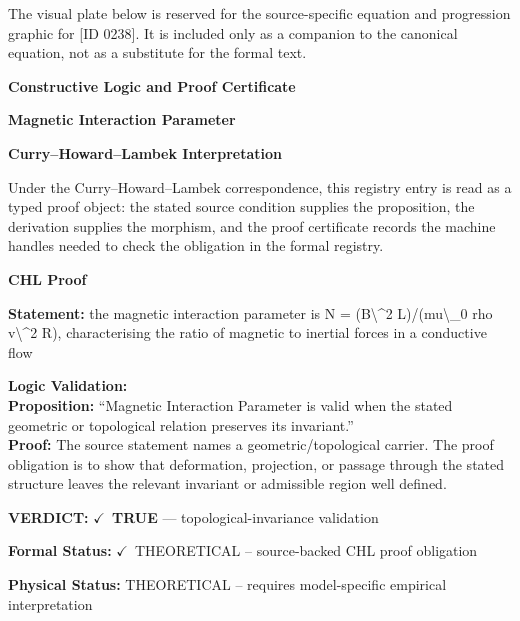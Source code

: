 \begingroup\footnotesize\sloppy
The visual plate below is reserved for the source-specific equation and progression graphic for [ID 0238]. It is included only as a companion to the canonical equation, not as a substitute for the formal text.
\par\endgroup
\ifTZPDarkEdition
{}
\fi

\clearpage
\begingroup\tzpsupportsetup
\noindent\textbf{\fontsize{10.8pt}{12.8pt}\selectfont [ID 0238] Constructive Logic and Proof Certificate}\par
\noindent\textbf{\fontsize{10pt}{12pt}\selectfont Magnetic Interaction Parameter}\par
\vspace{0.45em}
\begingroup
\footnotesize
\setlength{\parskip}{0.22em}
\setlength{\parindent}{0pt}
\noindent\textbf{Curry--Howard--Lambek Interpretation}\par
Under the Curry--Howard--Lambek correspondence, this registry entry is read as a typed proof
object: the stated source condition supplies the proposition, the derivation supplies the
morphism, and the proof certificate records the machine handles needed to check the obligation
in the formal registry.

\vspace{0.45em}
\noindent\textbf{CHL Proof}\par
\textbf{Statement:} the magnetic interaction parameter is N = (B\textbackslash{}\textasciicircum{}2 L)/(mu\textbackslash{}\_0 rho v\textbackslash{}\textasciicircum{}2 R), characterising
the ratio of magnetic to inertial forces in a conductive flow

\textbf{Logic Validation:}\\
\textbf{Proposition:} ``Magnetic Interaction Parameter is valid when the stated geometric or topological
relation preserves its invariant.''\\
\textbf{Proof:} The source statement names a geometric/topological carrier. The proof obligation is to
show that deformation, projection, or passage through the stated structure leaves the
relevant invariant or admissible region well defined.

\textbf{VERDICT:} \ensuremath{\checkmark}\ \textbf{TRUE} --- topological-invariance validation

\textbf{Formal Status:} \ensuremath{\checkmark}\ THEORETICAL -- source-backed CHL proof obligation

\textbf{Physical Status:} THEORETICAL -- requires model-specific empirical interpretation
\par\vspace{0.45em}
\par
\ifTZPDarkEdition
{}
\fi
\endgroup
\endgroup
